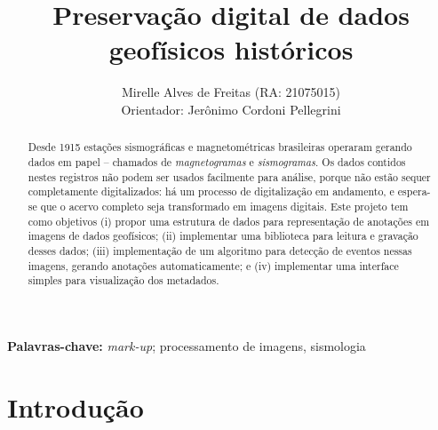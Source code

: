 \documentclass{article}
\title{Preservação digital de dados geofísicos históricos}
\author{Mirelle Alves de Freitas (RA: 21075015)\\
  Orientador: Jerônimo Cordoni Pellegrini}
\begin{document}
\maketitle

\begin{abstract}
  Desde 1915 estações sismográficas e magnetométricas brasileiras operaram gerando dados
  em papel -- chamados de {\em magnetogramas} e {\em sismogramas}. Os
  dados contidos nestes registros não podem ser usados facilmente para
  análise, porque não estão sequer completamente digitalizados: há um
  processo de 
  digitalização em andamento, e espera-se que o acervo completo seja
  transformado em imagens digitais.
  Este projeto tem como objetivos (i) propor uma estrutura de dados para
  representação de anotações em imagens de dados geofísicos; (ii)
  implementar uma biblioteca para leitura e gravação desses dados;
  (iii) implementação de um algoritmo para detecção de eventos nessas
  imagens, gerando anotações automaticamente; e (iv)  implementar uma
  interface simples para visualização dos metadados.
\end{abstract}


\begin{center}
  \begin{minipage}{10cm}
    \begin{center}
      \textbf{Palavras-chave:} {\em mark-up}; processamento de
      imagens, sismologia
    \end{center}
  \end{minipage}
\end{center}

\section{Introdução}
\end{document}

